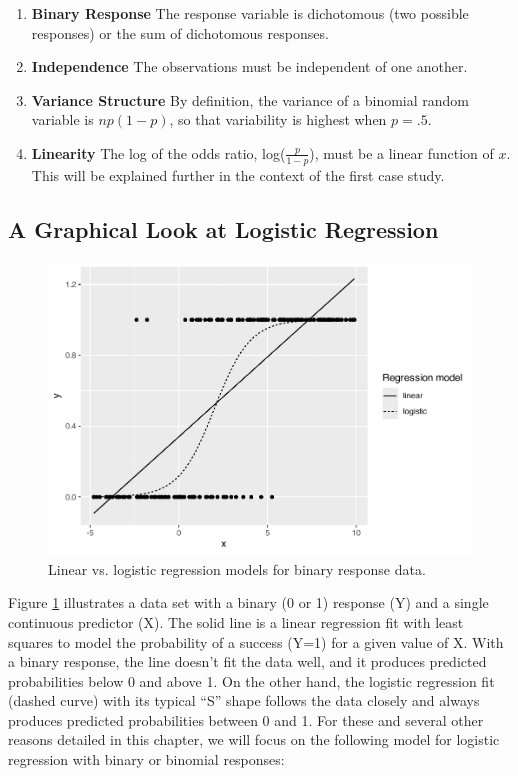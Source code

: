 \documentclass[
]{krantz}
\providecommand{\tightlist}{%
  \setlength{\itemsep}{0pt}\setlength{\parskip}{0pt}}
\begin{document}
\begin{enumerate}
\def\labelenumi{\arabic{enumi}.}
\tightlist
\item
  \textbf{Binary Response} The response variable is dichotomous (two possible responses) or the sum of dichotomous responses.
\item
  \textbf{Independence} The observations must be independent of one another.
\item
  \textbf{Variance Structure} By definition, the variance of a binomial random variable is \(np(1-p)\), so that variability is highest when \(p=.5\).
\item
  \textbf{Linearity} The log of the odds ratio, log(\(\frac{p}{1-p}\)), must be a linear function of \(x\). This will be explained further in the context of the first case study.
\end{enumerate}

\hypertarget{a-graphical-look-at-logistic-regression}{%
\subsection{A Graphical Look at Logistic Regression}\label{a-graphical-look-at-logistic-regression}}

\begin{figure}

{\centering \includegraphics[width=0.6\linewidth]{bookdown-BeyondMLR_files/figure-latex/OLSlogistic-1} 

}

\caption{Linear vs. logistic regression models for binary response data.}\label{fig:OLSlogistic}
\end{figure}

Figure \ref{fig:OLSlogistic} illustrates a data set with a binary (0 or 1) response (Y) and a single continuous predictor (X). The solid line is a linear regression fit with least squares to model the probability of a success (Y=1) for a given value of X. With a binary response, the line doesn't fit the data well, and it produces predicted probabilities below 0 and above 1. On the other hand, the logistic regression fit (dashed curve) with its typical ``S'' shape follows the data closely and always produces predicted probabilities between 0 and 1. For these and several other reasons detailed in this chapter, we will focus on the following model for logistic regression with binary or binomial responses:
\end{document}
